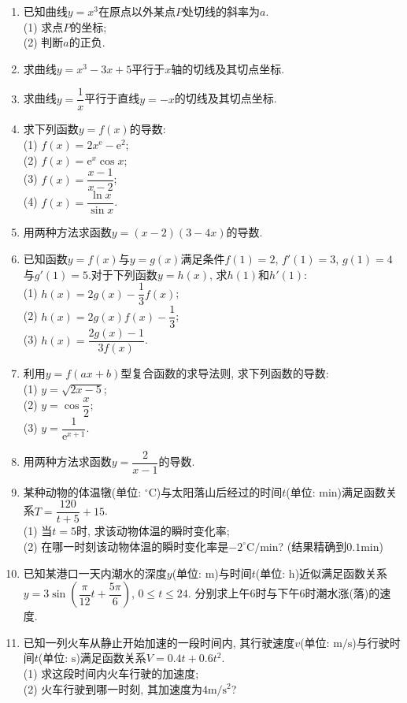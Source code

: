 \documentclass[10pt,a4paper]{article}
\begin{document}
\begin{enumerate}[1.]
\item 已知曲线$y=x^3$在原点以外某点$P$处切线的斜率为$a$.\\
(1) 求点$P$的坐标;\\
(2) 判断$a$的正负.
\item 求曲线$y=x^3-3x+5$平行于$x$轴的切线及其切点坐标.
\item 求曲线$y=\dfrac 1x$平行于直线$y=-x$的切线及其切点坐标.
\item 求下列函数$y=f(x)$的导数:\\
(1) $f(x)=2x^{\mathrm{e}}-\mathrm{e}^2$;\\
(2) $f(x)=\mathrm{e}^x\cos x$;\\
(3) $f(x)=\dfrac{x-1}{x-2}$;\\
(4) $f(x)=\dfrac{\ln x}{\sin x}$.
\item 用两种方法求函数$y=(x-2)(3-4x)$的导数.
\item 已知函数$y=f(x)$与$y=g(x)$满足条件$f(1)=2$, $f'(1)=3$, $g(1)=4$与$g'(1)=5$.对于下列函数$y=h(x)$, 求$h(1)$和$h'(1)$:\\
(1) $h(x)=2g(x)-\dfrac 13f(x)$;\\
(2) $h(x)=2g(x)f(x)-\dfrac 13$;\\
(3) $h(x)=\dfrac{2g(x)-1}{3f(x)}$.
\item 利用$y=f(ax+b)$型复合函数的求导法则, 求下列函数的导数:\\
(1) $y= \sqrt{2x-5}$;\\
(2) $y=\cos \dfrac x2$;\\
(3) $y= \dfrac 1{\mathrm{e}^{x+1}}$.
\item 用两种方法求函数$y= \dfrac 2{x-1}$的导数.
\item 某种动物的体温犜(单位: $^\circ\text{C}$)与太阳落山后经过的时间$t$(单位: $\text{min}$)满足函数关系$T=\dfrac{120}{t+5}+15$.\\
(1) 当$t=5$时, 求该动物体温的瞬时变化率;\\
(2) 在哪一时刻该动物体温的瞬时变化率是$-2^\circ\text{C}/\text{min}$? (结果精确到$0.1\text{min}$)
\item 已知某港口一天内潮水的深度$y$(单位: $\text{m}$)与时间$t$(单位: $\text{h}$)近似满足函数关系$y=3\sin (\dfrac \pi {12}t+\dfrac{5\pi} 6)$, $0\le t\le 24$. 分别求上午$6$时与下午$6$时潮水涨(落)的速度.
\item 已知一列火车从静止开始加速的一段时间内, 其行驶速度$v$(单位: $\text{m}/\text{s}$)与行驶时间$t$(单位: $\text{s}$)满足函数关系$V=0.4t+0. 6t^2$.\\
(1) 求这段时间内火车行驶的加速度;\\
(2) 火车行驶到哪一时刻, 其加速度为$4\text{m}/\text{s}^2$?

\end{enumerate}
\end{document}
